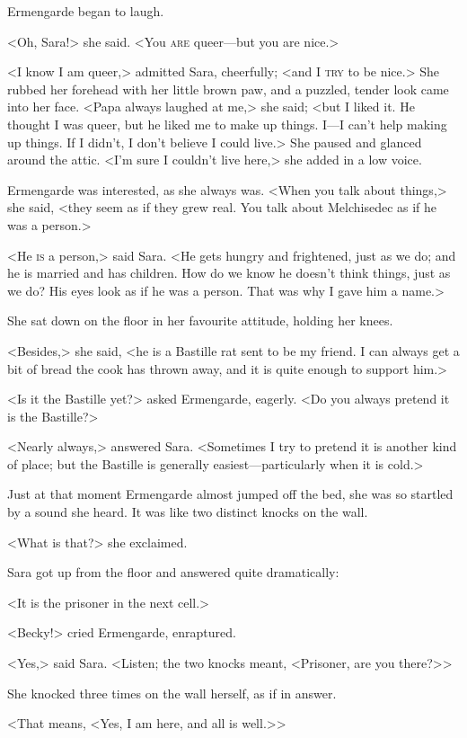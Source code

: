 Ermengarde began to laugh.

<Oh, Sara!> she said. <You \textsc{are} queer—but you are nice.>

<I know I am queer,> admitted Sara, cheerfully; <and I \textsc{try} to be nice.> She rubbed her forehead with her little brown paw, and a puzzled, tender look came into her face. <Papa always laughed at me,> she said; <but I liked it. He thought I was queer, but he liked me to make up things. I—I can't help making up things. If I didn't, I don't believe I could live.> She paused and glanced around the attic. <I'm sure I couldn't live here,> she added in a low voice.

Ermengarde was interested, as she always was. <When you talk about things,> she said, <they seem as if they grew real. You talk about Melchisedec as if he was a person.>

<He \textsc{is} a person,> said Sara. <He gets hungry and frightened, just as we do; and he is married and has children. How do we know he doesn't think things, just as we do? His eyes look as if he was a person. That was why I gave him a name.>

She sat down on the floor in her favourite attitude, holding her knees.

<Besides,> she said, <he is a Bastille rat sent to be my friend. I can always get a bit of bread the cook has thrown away, and it is quite enough to support him.>

<Is it the Bastille yet?> asked Ermengarde, eagerly. <Do you always pretend it is the Bastille?>

<Nearly always,> answered Sara. <Sometimes I try to pretend it is another kind of place; but the Bastille is generally easiest—particularly when it is cold.>

Just at that moment Ermengarde almost jumped off the bed, she was so startled by a sound she heard. It was like two distinct knocks on the wall.

<What is that?> she exclaimed.

Sara got up from the floor and answered quite dramatically:

<It is the prisoner in the next cell.>

<Becky!> cried Ermengarde, enraptured.

<Yes,> said Sara. <Listen; the two knocks meant, <Prisoner, are you there?>>

She knocked three times on the wall herself, as if in answer.

<That means, <Yes, I am here, and all is well.>>

